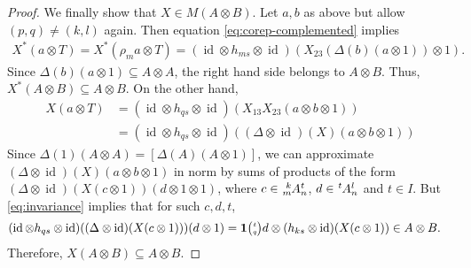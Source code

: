 \documentclass[11pt]{article}
\DeclareMathOperator{\id}{id}
\newcommand{\Grt}[3]{#1{\tiny {\begin{pmatrix} #2\\#3\end{pmatrix}}}}
\newcommand{\UnitC}[2]{\Grt{\mathbf{1}}{#1}{#2}}
\newcommand{\Gr}[5]{\tensor*[^{#2}_{#4}]{#1}{^{#3}_{#5}}}%
\theoremstyle{definition}
\numberwithin{equation}{section}
\begin{document}
\begin{proof}
We finally show that $X \in M(A\otimes B)$.  Let $a,b$ as above but
allow $(p,q)\neq (k,l)$ again. 
Then
equation \eqref{eq:corep-complemented}  implies 
\begin{align*}
  X^{*}(a\otimes T) = X^{*}(\rho_{m}a\otimes T) = (\id \otimes h_{ms}
  \otimes \id)(X_{23}(\Delta(b)(a\otimes 1))\otimes 1).
\end{align*}
Since $\Delta(b)(a\otimes 1) \subseteq A\otimes A$, the right hand
side belongs to $A\otimes B$. Thus, $X^{*}(A\otimes B) \subseteq
A\otimes B$. On the other hand, 
\begin{align*}
  X(a\otimes T) &= (\id \otimes h_{qs} \otimes
  \id)(X_{13}X_{23}(a\otimes b\otimes 1)) \\ &= (\id \otimes h_{qs}
  \otimes \id)((\Delta \otimes \id)(X)(a\otimes b\otimes 1)) 
\end{align*}
Since $\Delta(1)(A \otimes A) = [\Delta(A)(A \otimes 1)]$, we can
approximate $(\Delta \otimes \id)(X)(a\otimes b\otimes 1)$ in norm by sums of
products of the form $(\Delta \otimes\id)(X(c\otimes 1))(d \otimes
1\otimes 1)$, where $c\in \Gr{A}{k}{t}{m}{n}$, $d \in
\Gr{A}{t}{l}{}{n}$ and $t\in I$. But \eqref{eq:invariance} implies that for such $c,d,t$,
\begin{align*}
(\id \otimes h_{qs}
  \otimes \id)(  (\Delta \otimes\id)(X(c\otimes 1)))(d \otimes
1) &= \UnitC{t}{q}d \otimes (h_{ks} \otimes \id)(X(c\otimes 1)) \in A
\otimes B.
\end{align*}
Therefore, $X(A \otimes B) \subseteq A\otimes B$.
  \end{proof}
\end{document}
